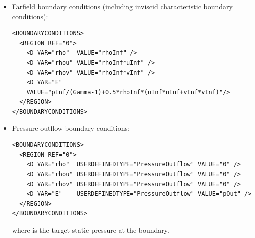 \begin{itemize}
\item Farfield boundary conditions (including inviscid characteristic boundary conditions):
\begin{lstlisting}[style=XmlStyle]
<BOUNDARYCONDITIONS>
  <REGION REF="0">
    <D VAR="rho"  VALUE="rhoInf" />
    <D VAR="rhou" VALUE="rhoInf*uInf" />
    <D VAR="rhov" VALUE="rhoInf*vInf" />
    <D VAR="E"
    VALUE="pInf/(Gamma-1)+0.5*rhoInf*(uInf*uInf+vInf*vInf)"/>
  </REGION>
</BOUNDARYCONDITIONS>
\end{lstlisting}

\item Pressure outflow boundary conditions:
\begin{lstlisting}[style=XmlStyle]
<BOUNDARYCONDITIONS>
  <REGION REF="0">
    <D VAR="rho"  USERDEFINEDTYPE="PressureOutflow" VALUE="0" />
    <D VAR="rhou" USERDEFINEDTYPE="PressureOutflow" VALUE="0" />
    <D VAR="rhov" USERDEFINEDTYPE="PressureOutflow" VALUE="0" />
    <D VAR="E"    USERDEFINEDTYPE="PressureOutflow" VALUE="pOut" />
  </REGION>
</BOUNDARYCONDITIONS>
\end{lstlisting}
where  is the target static pressure at the boundary.


\end{itemize}
